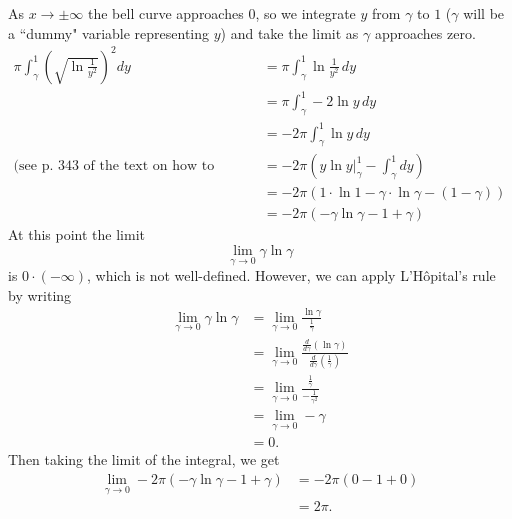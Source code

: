 \documentclass[11pt,letterpaper]{article}
\begin{document}
As $x\to\pm\infty$ the bell curve approaches $0$, so we integrate $y$ from $\gamma$ to $1$ ($\gamma$ will be a ``dummy" variable representing $y$) and take the limit as $\gamma$ approaches zero.
\begin{align*}
\pi\int_{\gamma}^1\left(\sqrt{\ln{\frac{1}{y^2}}}\right)^2dy &= \pi\int_{\gamma}^1\ln{\frac{1}{y^2}}\,dy \\
&= \pi\int_{\gamma}^1-2\ln{y}\,dy \\
&= -2\pi\int_{\gamma}^1\ln{y}\,dy \\
\text{(see p. 343 of the text on how to integrate natural log)   } &= -2\pi\left(y\ln{y}|_{\gamma}^1-\int_{\gamma}^1dy\right) \\
&= -2\pi\left(1\cdot\ln{1}-\gamma\cdot\ln{\gamma}-(1-\gamma)\right) \\
&= -2\pi(-\gamma\ln{\gamma}-1+\gamma) 
\end{align*}
At this point the limit
\[\lim_{\gamma\to 0}\gamma\ln{\gamma}\]
is $0\cdot(-\infty)$, which is not well-defined.  However, we can apply L'H\^opital's rule by writing
\begin{align*}
\lim_{\gamma\to 0}\gamma\ln{\gamma} &=\lim_{\gamma\to 0}\frac{\ln{\gamma}}{\frac{1}{\gamma}} \\
&=\lim_{\gamma\to 0}\frac{\frac{d}{d\gamma}\left(\ln{\gamma}\right)}{\frac{d}{d\gamma}\left(\frac{1}{\gamma}\right)} \\
&=\lim_{\gamma\to 0}\frac{\frac{1}{\gamma}}{-\frac{1}{\gamma^2}} \\
&=\lim_{\gamma\to 0}-\gamma \\
&=0.
\end{align*}
Then taking the limit of the integral, we get
\begin{align*}
\lim_{\gamma\to 0}-2\pi(-\gamma\ln{\gamma}-1+\gamma) &= -2\pi(0-1+0) \\
&=2\pi.
\end{align*}
\end{document}
